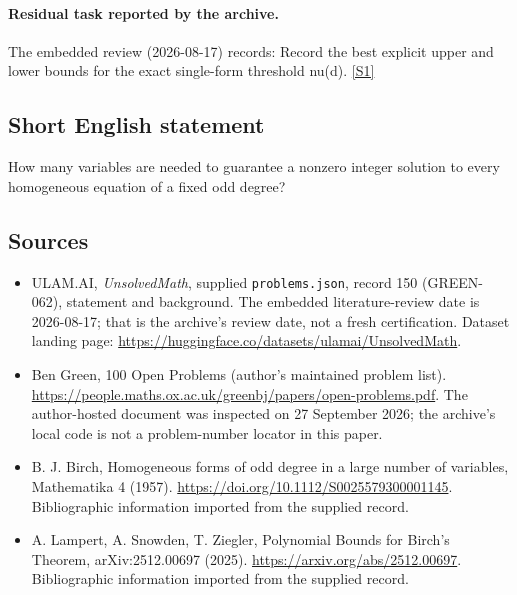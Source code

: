 \documentclass[11pt,a4paper]{article}
\newcommand{\sref}[2]{\hyperlink{source:#1:#2}{[S#2]}}
\begin{document}
\paragraph{Residual task reported by the archive.}

The embedded review (2026-08-17) records: Record the best explicit upper and lower bounds for the exact single-form threshold nu(d). \sref{150}{1}

\subsection{Short English statement}

How many variables are needed to guarantee a nonzero integer solution to every homogeneous equation of a fixed odd degree?

\subsection{Sources}

{\small

\begin{itemize}

\item[\hypertarget{source:150:1}{S1}] ULAM.AI, \emph{UnsolvedMath}, supplied \texttt{problems.json}, record 150 (GREEN-062), statement and background. The embedded literature-review date is 2026-08-17; that is the archive’s review date, not a fresh certification. Dataset landing page: \url{https://huggingface.co/datasets/ulamai/UnsolvedMath}.

\item[\hypertarget{source:150:2}{S2}] Ben Green, 100 Open Problems (author’s maintained problem list). \url{https://people.maths.ox.ac.uk/greenbj/papers/open-problems.pdf}. The author-hosted document was inspected on 27 September 2026; the archive’s local code is not a problem-number locator in this paper.

\item[\hypertarget{source:150:3}{S3}] B. J. Birch, Homogeneous forms of odd degree in a large number of variables, Mathematika 4 (1957). \url{https://doi.org/10.1112/S0025579300001145}. Bibliographic information imported from the supplied record.

\item[\hypertarget{source:150:4}{S4}] A. Lampert, A. Snowden, T. Ziegler, Polynomial Bounds for Birch's Theorem, arXiv:2512.00697 (2025). \url{https://arxiv.org/abs/2512.00697}. Bibliographic information imported from the supplied record.

\end{itemize}

}

\label{end:150}
\end{document}
